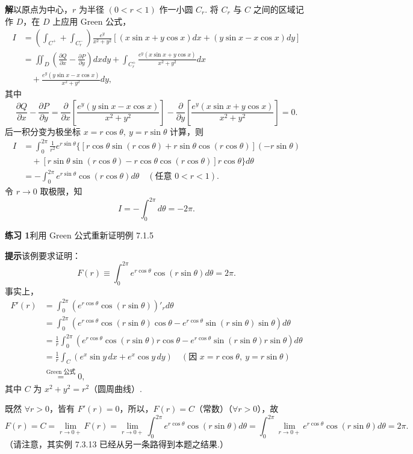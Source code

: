 \documentclass[UTF8,12pt,a4paper,fontset=fandol]{ctexart}
\providecommand{\xlongequal}[1]{\overset{#1}{=}}
\begin{document}
\noindent\textbf{解}\quad 以原点为中心，$r$ 为半径 $(0<r<1)$ 作一小圆 $C_r$. 将 $C_r$ 与 $C$ 之间的区域记作 $D$，在 $D$ 上应用 Green 公式，
\[
\begin{aligned}
I&=\left(\int_{C^+}+\int_{C_r^-}\right)
\frac{e^y}{x^2+y^2}
[(x\sin x+y\cos x)dx+(y\sin x-x\cos x)dy]\\
&=\iint_D\left(\frac{\partial Q}{\partial x}-\frac{\partial P}{\partial y}\right)dxdy
+\int_{C_r^+}\frac{e^y(x\sin x+y\cos x)}{x^2+y^2}dx\\
&\quad+\frac{e^y(y\sin x-x\cos x)}{x^2+y^2}dy,
\end{aligned}
\]
其中
\[
\frac{\partial Q}{\partial x}-\frac{\partial P}{\partial y}
=\frac{\partial}{\partial x}\left[\frac{e^y(y\sin x-x\cos x)}{x^2+y^2}\right]
-\frac{\partial}{\partial y}\left[\frac{e^y(x\sin x+y\cos x)}{x^2+y^2}\right]=0.
\]
后一积分变为极坐标 $x=r\cos\theta,\ y=r\sin\theta$ 计算，则
\[
\begin{aligned}
I&=\int_0^{2\pi}\frac1{r^2}e^{r\sin\theta}
\{[r\cos\theta\sin(r\cos\theta)+r\sin\theta\cos(r\cos\theta)](-r\sin\theta)\\
&\quad+[r\sin\theta\sin(r\cos\theta)-r\cos\theta\cos(r\cos\theta)]r\cos\theta\}d\theta\\
&=-\int_0^{2\pi}e^{r\sin\theta}\cos(r\cos\theta)d\theta
\quad(\text{任意 }0<r<1).
\end{aligned}
\]
令 $r\to0$ 取极限，知
\[
I=-\int_0^{2\pi}d\theta=-2\pi.
\]

\noindent\textbf{练习 1}\quad 利用 Green 公式重新证明例 7.1.5

\noindent\textbf{提示}\quad 该例要求证明：
\[
F(r)\equiv\int_0^{2\pi}e^{r\cos\theta}\cos(r\sin\theta)d\theta=2\pi.
\]
事实上，
\[
\begin{aligned}
F'(r)
&=\int_0^{2\pi}(e^{r\cos\theta}\cos(r\sin\theta))'_r d\theta\\
&=\int_0^{2\pi}(e^{r\cos\theta}\cos(r\sin\theta)\cos\theta
-e^{r\cos\theta}\sin(r\sin\theta)\sin\theta)d\theta\\
&=\frac1r\int_0^{2\pi}(e^{r\cos\theta}\cos(r\sin\theta)r\cos\theta
-e^{r\cos\theta}\sin(r\sin\theta)r\sin\theta)d\theta\\
&=\frac1r\int_C(e^x\sin y\,dx+e^x\cos y\,dy)\quad
(\text{因 }x=r\cos\theta,\ y=r\sin\theta)\\
&\xlongequal{\text{Green 公式}}0,
\end{aligned}
\]
其中 $C$ 为 $x^2+y^2=r^2$（圆周曲线）.

既然 $\forall r>0$，皆有 $F'(r)=0$，所以，$F(r)=C$（常数）（$\forall r>0$），故
\[
F(r)=C=\lim_{r\to0+}F(r)
=\lim_{r\to0+}\int_0^{2\pi}e^{r\cos\theta}\cos(r\sin\theta)d\theta
=\int_0^{2\pi}\lim_{r\to0+}e^{r\cos\theta}\cos(r\sin\theta)d\theta=2\pi.
\]
（请注意，其实例 7.3.13 已经从另一条路得到本题之结果.）
\end{document}
